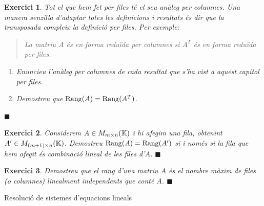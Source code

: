 \documentclass[
  11pt,
]{book}
\makeatletter
\numberwithin{dummy}{section}
\theoremstyle{maincolornumbox}
\newtheorem{exerciseT}{Exercici}[chapter]
\theoremstyle{blacknumex}
\theoremstyle{blacknumbox}
\theoremstyle{maincolornum}
\newenvironment{exercise}{\begin{eBox}\begin{exerciseT}}{\hfill{\color{maincolor}\tiny\ensuremath{\blacksquare}}\end{exerciseT}\end{eBox}}
\renewcommand{\section}{\@startsection{section}{1}{\z@}
{-4ex \@plus -1ex \@minus -.4ex}
{1ex \@plus.2ex }
{\normalfont\large\sffamily\bfseries}}
\makeatother
\begin{document}
\begin{exercise}

Tot el que hem fet per files té el seu anàleg per columnes. Una manera
senzilla d'adaptar totes les definicions i resultats és dir que la
transposada compleix la definició per files. Per exemple:

\begin{quote}
La matriu \(A\) és \emph{en forma reduïda per columnes} si \(A^T\) és en forma
reduïda per files.
\end{quote}

\begin{enumerate}
\def\labelenumi{(\alph{enumi})}
\item
  Enuncieu l'anàleg per columnes de cada resultat que s'ha vist a
  aquest capítol per files.
\item
  Demostreu que \(\operatorname{Rang}(A)=\operatorname{Rang}(A^T)\).
\end{enumerate}

\end{exercise}

\begin{exercise}
Considerem \(A\in M_{m\times n}(\mathbb{K})\) i hi afegim una fila, obtenint
\(A'\in M_{(m+1)\times n}(\mathbb{K})\). Demostreu \(\operatorname{Rang}(A)=\operatorname{Rang}(A')\) si i només
si la fila que hem afegit és combinació lineal de les files d'\(A\).
\end{exercise}

\begin{exercise}
Demostreu que el rang d'una matriu \(A\) és el nombre màxim de files (o
columnes) linealment independents que conté \(A\).
\end{exercise}

\section{Resolució de sistemes d'equacions lineals}\label{resoluciuxf3-de-sistemes-dequacions-lineals}
\end{document}
